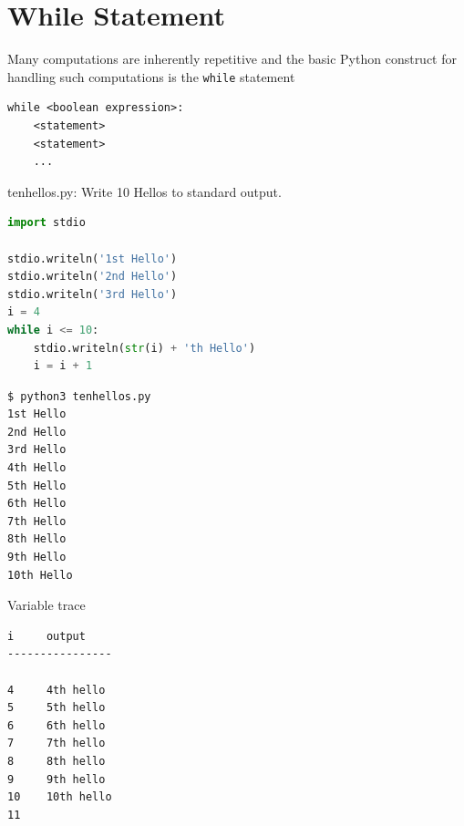 \documentclass[8pt,a4paper,compress]{beamer}
\begin{document}
\section{While Statement}
\begin{frame}[fragile]
\pause

Many computations are inherently repetitive and the basic Python construct for handling such computations is the \lstinline{while} statement

\pause\bigskip

\begin{lstlisting}[language={},style=focusin]
while <boolean expression>:
    <statement>
    <statement>
    ...
\end{lstlisting}
\end{frame}

\begin{frame}[fragile]
\pause

\begin{framed}
\tiny tenhellos.py: Write 10 Hellos to standard output.
\end{framed}

\begin{lstlisting}[language=Python,style=focusin]
import stdio

stdio.writeln('1st Hello')
stdio.writeln('2nd Hello')
stdio.writeln('3rd Hello')
i = 4
while i <= 10:
    stdio.writeln(str(i) + 'th Hello')
    i = i + 1
\end{lstlisting}

\pause\bigskip

\begin{minipage}{150pt}
\begin{lstlisting}[language={},style=focusin]
$ python3 tenhellos.py 
1st Hello
2nd Hello
3rd Hello
4th Hello
5th Hello
6th Hello
7th Hello
8th Hello
9th Hello
10th Hello
\end{lstlisting}
\end{minipage}\hfill
\begin{minipage}{100pt}
Variable trace
\begin{lstlisting}[language={},style=focusin]
i     output
----------------

4     4th hello
5     5th hello
6     6th hello
7     7th hello
8     8th hello
9     9th hello
10    10th hello
11
\end{lstlisting}
\end{minipage}
\end{frame}
\end{document}
